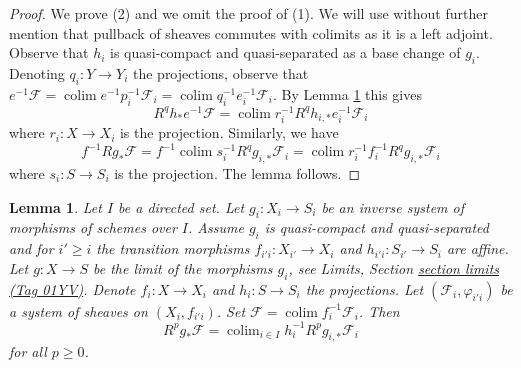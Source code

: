 \documentclass{amsart}
\theoremstyle{plain}
\newtheorem{lemma}[subsection]{Lemma}
\theoremstyle{definition}
\theoremstyle{remark}
\numberwithin{equation}{subsection}
\def\colim{\mathop{\mathrm{colim}}\nolimits}
\begin{document}
\begin{proof}
We prove (2) and we omit the proof of (1). We will use without further
mention that pullback of sheaves commutes with colimits as it is a
left adjoint. Observe that $h_i$ is quasi-compact and quasi-separated as a
base change of $g_i$.
Denoting $q_i : Y \to Y_i$ the projections, observe that
$e^{-1}\mathcal{F} = \colim e^{-1}p_i^{-1}\mathcal{F}_i =
\colim q_i^{-1}e_i^{-1}\mathcal{F}_i$.
By Lemma \ref{lemma-relative-colimit-general}
this gives
$$
R^qh_*e^{-1}\mathcal{F} = \colim r_i^{-1}R^qh_{i, *}e_i^{-1}\mathcal{F}_i
$$
where $r_i : X \to X_i$ is the projection.
Similarly, we have
$$
f^{-1}Rg_*\mathcal{F} =
f^{-1}\colim s_i^{-1}R^qg_{i, *}\mathcal{F}_i =
\colim r_i^{-1}f_i^{-1}R^qg_{i, *}\mathcal{F}_i
$$
where $s_i : S \to S_i$ is the projection. The lemma follows.
\end{proof}


\begin{lemma}
\label{lemma-relative-colimit-general}
Let $I$ be a directed set. Let $g_i : X_i \to S_i$ be an inverse system of
morphisms of schemes over $I$. Assume $g_i$ is quasi-compact and
quasi-separated and for $i' \geq i$ the transition morphisms
$f_{i'i} : X_{i'} \to X_i$ and $h_{i'i} : S_{i'} \to S_i$ are affine.
Let $g : X \to S$ be the limit of the morphisms $g_i$, see
Limits, Section \href{https://stacks.math.columbia.edu/tag/01YV}{section limits (Tag 01YV)}.
Denote $f_i : X \to X_i$ and $h_i : S \to S_i$ the projections.
Let $(\mathcal{F}_i, \varphi_{i'i})$ be a system of sheaves
on $(X_i, f_{i'i})$. Set $\mathcal{F} = \colim f_i^{-1}\mathcal{F}_i$. Then
$$
R^p g_* \mathcal{F} =
\colim_{i \in I} h_i^{-1}R^p g_{i, *} \mathcal{F}_i
$$
for all $p \geq 0$.
\end{lemma}
\end{document}
